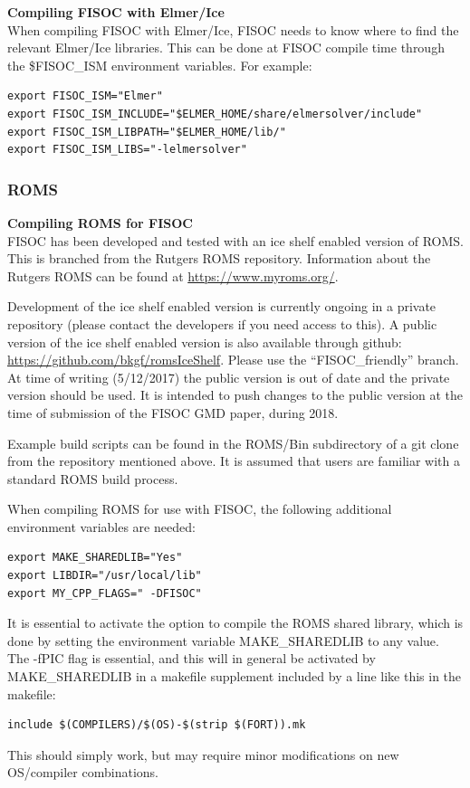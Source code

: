 \documentclass[12pt]{article}
\begin{document}
\vspace{10pt}

\textbf{Compiling FISOC with Elmer/Ice}\\
When compiling FISOC with Elmer/Ice, FISOC needs to know where to 
find the relevant Elmer/Ice libraries.  
This can be done at FISOC compile time through the 
\$FISOC\_ISM
environment variables.  For example:

\begin{lstlisting}
export FISOC_ISM="Elmer"
export FISOC_ISM_INCLUDE="$ELMER_HOME/share/elmersolver/include"
export FISOC_ISM_LIBPATH="$ELMER_HOME/lib/"
export FISOC_ISM_LIBS="-lelmersolver"
\end{lstlisting}





\subsubsection{ROMS}
\label{sec:PreReqROMS}

\textbf{Compiling ROMS for FISOC} \\
FISOC has been developed and tested with an ice shelf enabled version of ROMS. 
This is branched from the Rutgers ROMS repository.  Information about the Rutgers ROMS 
can be found at \url{https://www.myroms.org/}.

Development of the ice shelf enabled version  is currently ongoing 
in a private repository 
(please contact the developers if you need access to this).
A public version of the ice shelf enabled version is also available 
through github: 
\url{https://github.com/bkgf/romsIceShelf}.  
Please use the ``FISOC\_friendly'' branch.
At time of writing (5/12/2017) the public version is out of date and 
the private version should be used. 
It is intended to push changes to the public version at the time of 
submission of the FISOC GMD paper, during 2018.

Example build scripts can be found in the ROMS/Bin subdirectory of a git clone 
from the repository mentioned above.
It is assumed that users are familiar with a standard ROMS build process. 


When compiling ROMS for use with FISOC, the following additional environment
variables are needed:
\begin{lstlisting}
export MAKE_SHAREDLIB="Yes"
export LIBDIR="/usr/local/lib"
export MY_CPP_FLAGS=" -DFISOC"
\end{lstlisting}

It is essential to activate the option to compile the ROMS shared library, which 
is done by setting the environment variable MAKE\_SHAREDLIB to any value. 
The -fPIC flag is essential, and this will in general be activated 
by MAKE\_SHAREDLIB in a makefile supplement included by a line like 
this in the makefile:
\begin{lstlisting}
include $(COMPILERS)/$(OS)-$(strip $(FORT)).mk
\end{lstlisting}
This should simply work, but may require minor modifications on new 
OS/compiler combinations.
\end{document}
